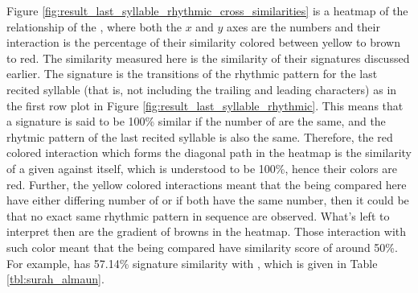 Figure \ref{fig:result_last_syllable_rhythmic_cross_similarities} is a heatmap of the relationship of the  , where both the $x$ and $y$ axes are the   numbers and their interaction is the percentage of their similarity colored between yellow to brown to red. The similarity measured here is the similarity of their signatures discussed earlier. The signature is the transitions of the rhythmic pattern for the last recited syllable (that is, not including the trailing and leading characters) as in the first row plot in Figure \ref{fig:result_last_syllable_rhythmic}. This means that a signature is said to be 100\% similar if the number of   are the same, and the rhytmic pattern of the last recited syllable is also the same. Therefore, the red colored interaction which forms the diagonal path in the heatmap is the similarity of a given   against itself, which is understood to be 100\%, hence their colors are red. Further, the yellow colored interactions meant that the   being compared here have either differing number of   or if both have the same number, then it could be that no exact same rhythmic pattern in sequence are observed. What's left to interpret then are the gradient of browns in the heatmap. Those interaction with such color meant that the   being compared have similarity score of around 50\%. For example,   has 57.14\% signature similarity with  , which is given in Table \ref{tbl:surah_almaun}. 

